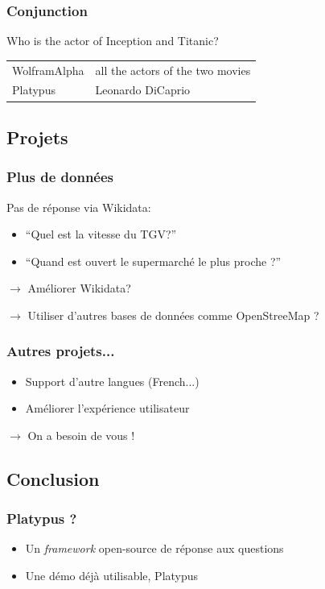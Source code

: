 \begin{frame}
    \frametitle{Conjunction}

Who is the actor of Inception and Titanic?
    \begin{tabular}{ll}
        \alert{WolframAlpha} & all the actors of the two movies\\
        \alert{Platypus} & Leonardo DiCaprio\\
    \end{tabular}
\end{frame}


\subsection{Projets}

\begin{frame}
    \frametitle{Plus de données}

    Pas de réponse via \alert{Wikidata}:
    \begin{itemize}
      \item ``Quel est la vitesse du TGV?''
      \item ``Quand est ouvert le supermarché le plus proche ?''
    \end{itemize}

    \pause
    \medbreak

    $\rightarrow$ Améliorer Wikidata?

    $\rightarrow$ Utiliser d'autres bases de données comme \alert{OpenStreeMap} ?
\end{frame}

\begin{frame}
    \frametitle{Autres projets...}

    \begin{itemize}
        \item Support d'autre langues (French...)
        \item Améliorer l'expérience utilisateur
    \end{itemize}
    
    \pause
     \medbreak

    $\rightarrow$ On a besoin de vous !
\end{frame}

\subsection{Conclusion}

\begin{frame}
    \frametitle{Platypus ?}

    \begin{itemize}
        \item Un \textit{framework} open-source de réponse aux questions
        \item Une démo déjà utilisable, \alert{Platypus}
    \end{itemize}
\end{frame}


